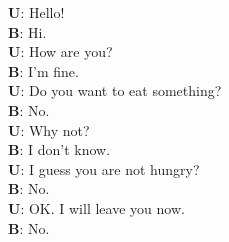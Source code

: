
\setlength{\abovedisplayskip}{20pt}
\setlength{\belowdisplayskip}{20pt}

\small

\textbf{U}: Hello!\\\indent
\textbf{B}: Hi.\\\indent
\textbf{U}: How are you?\\\indent
\textbf{B}: I'm fine.\\\indent
\textbf{U}: Do you want to eat something?\\\indent
\textbf{B}: No.\\\indent
\textbf{U}: Why not?\\\indent
\textbf{B}: I don't know.\\\indent
\textbf{U}: I guess you are not hungry?\\\indent
\textbf{B}: No.\\\indent
\textbf{U}: OK. I will leave you now.\\\indent
\textbf{B}: No.\\

\normalsize
